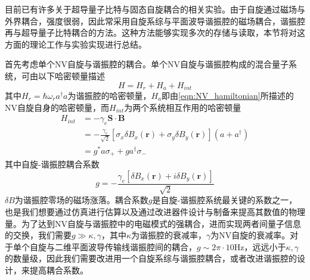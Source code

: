             目前已有许多关于超导量子比特与固态自旋耦合的相关实验。由于自旋通过磁场与外界耦合，强度很弱，因此常采用自旋系综与平面波导谐振腔的磁场耦合，谐振腔再与超导量子比特耦合的方法\cite{grezes2016towards}。这种方法能够实现多次的存储与读取，本节将对这方面的理论工作与实验实现进行总结。

            首先考虑单个NV自旋与谐振腔的耦合。单个NV自旋与谐振腔构成的混合量子系统，可由以下哈密顿量描述
            \begin{equation}
            \label{eqn:Hamiltonian_resonator_NV}
                H = H_r + H_a + H_{int}
            \end{equation}
            其中$H_r = \hbar \omega_r a^\dagger a $为谐振腔的哈密顿量，$H_a$即由\ref{eqn:NV_hamiltonian}所描述的NV自旋自身的哈密顿量，而$H_{int}$为两个系统相互作用的哈密顿量\cite{grezes2016towards}
            \begin{align}
                H_{int} &= - \gamma_e \bm S \cdot \bm B\\
                        &= - \frac{\gamma_e}{\sqrt 2} [ \sigma_x \delta B_x (\bm r) + \sigma_y \delta B_y (\bm r) ](a + a^\dagger) \\
                        &= g^* a \sigma_+ + g a^\dagger \sigma_-
            \end{align}
            其中自旋-谐振腔耦合系数
            \begin{equation}
            \label{eqn:coupling_coeff}
                g = - \frac{\gamma_e [ \delta B_x(\bm r) + i \delta B_y(\bm r) ] }{\sqrt 2}
            \end{equation}
            $\delta B $为谐振腔零场的磁场涨落。耦合系数$g$是自旋-谐振腔系统最关键的系数之一，也是我们想要通过仿真进行估算以及通过改进器件设计与制备来提高其数值的物理量。为了达到NV自旋与谐振腔中的电磁模式的强耦合，进而实现两者间量子信息的交换，我们需要$ g\gg \kappa, \gamma $，其中$ \kappa $为谐振腔的衰减率，$\gamma $为NV自旋的衰减率。对于单个自旋与二维平面波导传输线谐振腔间的耦合，$g\sim 2\pi\cdot 10 $Hz\cite{grezes2016towards}，远远小于$\kappa, \gamma $的数量级，因此我们需要改进用一个自旋系综与谐振腔耦合，或者改进谐振腔的设计，来提高耦合系数。

